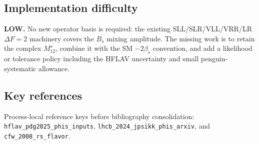 \subsection*{Implementation difficulty}
\textbf{LOW.}  No new operator basis is required: the existing
SLL/SLR/VLL/VRR/LR \(\Delta F=2\) machinery covers the \(B_s\) mixing
amplitude.  The missing work is to retain the complex \(M_{12}^s\), combine it
with the SM \(-2\beta_s\) convention, and add a likelihood or tolerance policy
including the HFLAV uncertainty and small penguin-systematic allowance.

\subsection*{Key references}
Process-local reference keys before bibliography consolidation:
\texttt{hflav\_pdg2025\_phis\_inputs},
\texttt{lhcb\_2024\_jpsikk\_phis\_arxiv}, and
\texttt{cfw\_2008\_rs\_flavor}.
